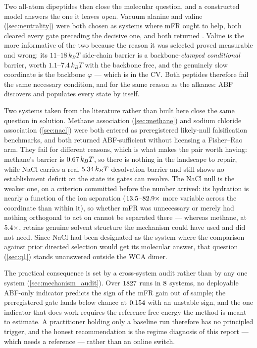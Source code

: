 Two all-atom dipeptides then close the molecular question, and a constructed model answers
the one it leaves open. Vacuum alanine and valine (\cref{sec:neutrality}) were both chosen as
systems where mFR ought to help, both cleared every gate preceding the decisive one, and both
returned \textbf{\AlaVerdict}. Valine is the more informative of the two because the reason it
was selected proved measurable and wrong: its $11$--$18\,k_BT$ side-chain barrier is a
backbone-\emph{clamped conditional} barrier, worth $1.1$--$7.4\,k_BT$ with the backbone free,
and the genuinely slow coordinate is the backbone $\varphi$ --- which is in the CV. Both
peptides therefore fail the same necessary condition, and for the same reason as the alkanes:
ABF discovers and populates every state by itself.

Two systems taken from the literature rather than built here close the same question in
solution. Methane association (\cref{sec:methane}) and sodium chloride association
(\cref{sec:nacl}) were both entered as preregistered likely-null falsification benchmarks, and
both returned ABF-sufficient without licensing a Fisher--Rao arm. They fail for different
reasons, which is what makes the pair worth having: methane's barrier is
$0.67\,k_BT$, so there is nothing in the landscape to repair, while NaCl carries a
real $5.34\,k_BT$ desolvation barrier and still shows no establishment deficit on the
state its gates can resolve. The NaCl null is the weaker one, on a criterion committed before
the number arrived: its hydration is nearly a function of the ion separation
($13.5$--$82.9\times$ more variable across the coordinate than within it), so
whether mFR was unnecessary or merely had nothing orthogonal to act on cannot be separated
there --- whereas methane, at $5.4\times$, retains genuine solvent structure the
mechanism could have used and did not need. Since NaCl had been designated as the system where
the comparison against prior directed selection would get its molecular answer, that question
(\cref{sec:q1}) stands unanswered outside the WCA dimer.

The practical consequence is set by a cross-system audit rather than by any one system
(\cref{sec:mechanism_audit}). Over $1827$ runs in $8$ systems, no deployable
ABF-only indicator predicts the sign of the mFR gain out of sample; the preregistered gate lands
below chance at $0.154$ with an unstable sign, and the one indicator that does work
requires the reference free energy the method is meant to estimate. A practitioner holding only
a baseline run therefore has no principled trigger, and the honest recommendation is the regime
diagnosis of this report --- which needs a reference --- rather than an online switch.

